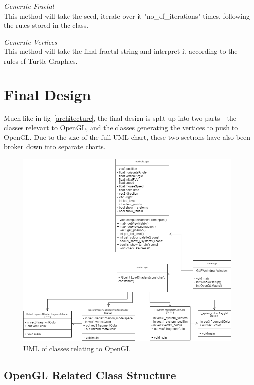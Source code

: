 \documentclass[a4paper,10pt]{report}
\begin{document}
\textit{Generate Fractal}\\

This method will take the seed, iterate over it  "no\_of\_iterations" times, following the rules stored in the class.

\textit{Generate Vertices}\\

This method will take the final fractal string and interpret it according to the rules of Turtle Graphics.

\clearpage

\section{Final Design}

Much like in fig~\ref{architecture}, the final design is split up into two parts - the classes relevant to OpenGL, and the classes generating the vertices to push to OpenGL. Due to the size of the full UML chart, these two sections have also been broken down into separate charts.

\begin{figure}[h!]
\centering
  \includegraphics[width=1\textwidth]{Images/Charts/OpenGL_UML.png}
 \caption{UML of classes relating to OpenGL}
 \label{fig:opengl_uml}
\end{figure}


\subsection{OpenGL Related Class Structure}
\end{document}
